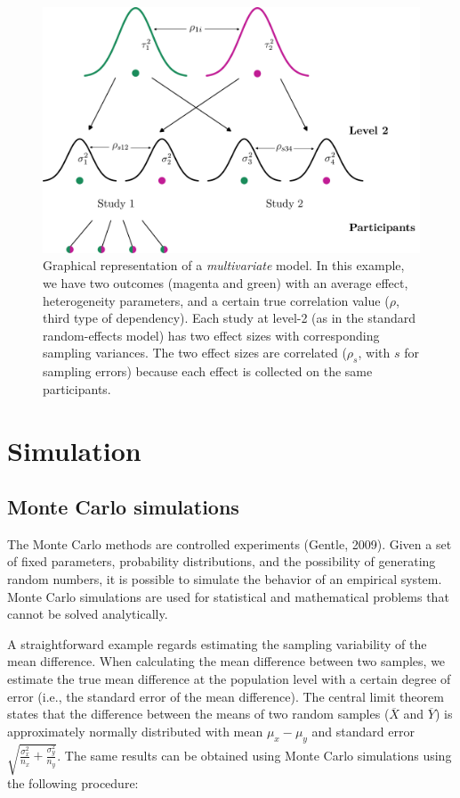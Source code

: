 \documentclass[
  man,floatsintext]{apa6}
\begin{document}
\begin{figure}[H]

{\centering \includegraphics[width=0.8\linewidth]{img/multivariate.pdf } 

}

\caption{Graphical representation of a \emph{multivariate} model. In this example, we have two outcomes (magenta and green) with an average effect, heterogeneity parameters, and a certain true correlation value (\(\rho\), third type of dependency). Each study at level-2 (as in the standard random-effects model) has two effect sizes with corresponding sampling variances. The two effect sizes are correlated (\(\rho_{s}\), with \(s\) for sampling errors) because each effect is collected on the same participants.}\label{fig:img-multivariate}
\end{figure}

\normalsize

\hypertarget{simulation}{%
\section{Simulation}\label{simulation}}

\hypertarget{monte-carlo-simulations}{%
\subsection{Monte Carlo simulations}\label{monte-carlo-simulations}}

The Monte Carlo methods are controlled experiments (Gentle, 2009). Given a set of fixed parameters, probability distributions, and the possibility of generating random numbers, it is possible to simulate the behavior of an empirical system. Monte Carlo simulations are used for statistical and mathematical problems that cannot be solved analytically.

A straightforward example regards estimating the sampling variability of the mean difference. When calculating the mean difference between two samples, we estimate the true mean difference at the population level with a certain degree of error (i.e., the standard error of the mean difference). The central limit theorem states that the difference between the means of two random samples (\(\overline{X}\) and \(\overline{Y}\)) is approximately normally distributed with mean \(\mu_{x} - \mu_{y}\) and standard error \(\sqrt{\frac{\sigma^2_x}{{n_x}} + \frac{\sigma^2_y}{{n_y}}}\). The same results can be obtained using Monte Carlo simulations using the following procedure:
\end{document}
